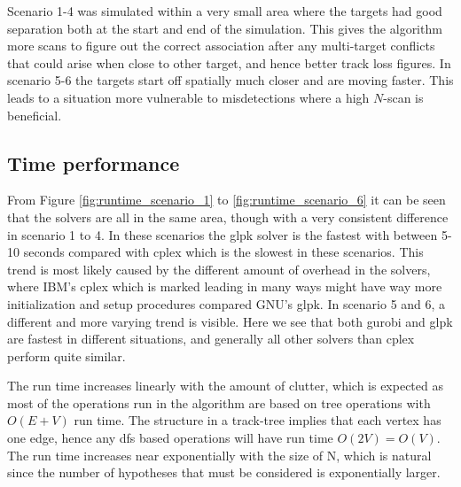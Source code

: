 Scenario 1-4 was simulated within a very small area where the targets had good separation both at the start and end of the simulation. This gives the algorithm more \glspl{scan} to figure out the correct association after any multi-target conflicts that could arise when close to other target, and hence better track loss figures. In scenario 5-6 the targets start off spatially much closer and are moving faster. This leads to a situation more vulnerable to misdetections where a high $N$-scan is beneficial. 

\subsection{Time performance}
From Figure \ref{fig:runtime_scenario_1} to \ref{fig:runtime_scenario_6} it can be seen that the solvers are all in the same area, though with a very consistent difference in scenario 1 to 4. In these scenarios the \gls{glpk} solver is the fastest with between 5-10 seconds compared with \gls{cplex} which is the slowest in these scenarios. This trend is most likely caused by the different amount of overhead in the solvers, where IBM's \gls{cplex} which is marked leading in many ways might have way more initialization and setup procedures compared GNU's \gls{glpk}. In scenario 5 and 6, a different and more varying trend is visible. Here we see that both \gls{gurobi} and \gls{glpk} are fastest in different situations, and generally all other solvers than \gls{cplex} perform quite similar.

The run time increases linearly with the amount of clutter, which is expected as most of the operations run in the algorithm are based on tree operations with $O(E+V)$ run time. The structure in a track-tree implies that each vertex has one edge, hence any \gls{dfs} based operations will have run time  $O(2V)=O(V)$. The run time increases near exponentially with the size of N, which is natural since the number of hypotheses that must be considered is exponentially larger.